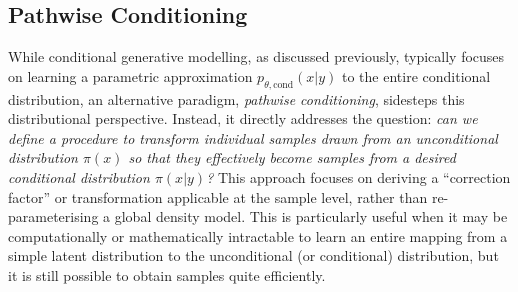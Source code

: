 
\subsection{Pathwise Conditioning}

While conditional generative modelling, as discussed previously, typically focuses on learning a parametric approximation $p_{\theta, \text{cond}}(x|y)$ to the entire conditional distribution, an alternative paradigm, \emph{pathwise conditioning}, sidesteps this distributional perspective. Instead, it directly addresses the question: \emph{can we define a procedure to transform individual samples drawn from an unconditional distribution $\pi(x)$ so that they effectively become samples from a desired conditional distribution $\pi(x|y)$?} This approach focuses on deriving a ``correction factor'' or transformation applicable at the sample level, rather than re-parameterising a global density model. This is particularly useful when it may be computationally or mathematically intractable to learn an entire mapping from a simple latent distribution to the unconditional (or conditional) distribution, but it is still possible to obtain samples quite efficiently.

